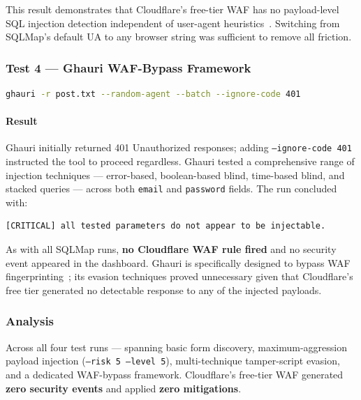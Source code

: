 \documentclass[12pt, a4paper]{report}   %
\begin{document}
This result demonstrates that Cloudflare's free-tier WAF has no payload-level SQL
injection detection independent of user-agent heuristics~\cite{owasp-waf}. Switching 
from SQLMap's default UA to any browser string was sufficient to remove all friction.

\subsubsection{Test 4 --- Ghauri WAF-Bypass Framework}

\begin{lstlisting}[language=bash, caption={Ghauri with POST Request File and Random UA}]
ghauri -r post.txt --random-agent --batch --ignore-code 401
\end{lstlisting}

\paragraph{Result}

Ghauri initially returned 401 Unauthorized responses; adding \texttt{--ignore-code 401}
instructed the tool to proceed regardless. Ghauri tested a comprehensive range of
injection techniques --- error-based, boolean-based blind, time-based blind, and
stacked queries --- across both \texttt{email} and \texttt{password} fields. The run
concluded with:

\begin{lstlisting}
[CRITICAL] all tested parameters do not appear to be injectable.
\end{lstlisting}

As with all SQLMap runs, \textbf{no Cloudflare WAF rule fired} and no security event
appeared in the dashboard. Ghauri is specifically designed to bypass WAF 
fingerprinting~\cite{azure-waf-rules}; its evasion techniques proved unnecessary given 
that Cloudflare's free tier generated no detectable response to any of the injected 
payloads.

\subsubsection{Analysis}

Across all four test runs --- spanning basic form discovery, maximum-aggression payload
injection (\texttt{--risk 5 --level 5}), multi-technique tamper-script evasion, and a
dedicated WAF-bypass framework. Cloudflare's free-tier WAF generated
\textbf{zero security events} and applied \textbf{zero mitigations}.
\end{document}
